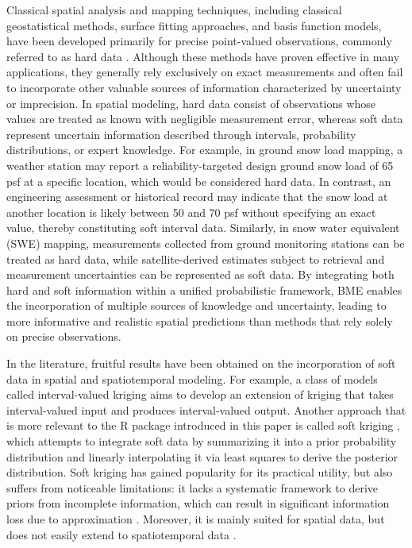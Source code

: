 Classical spatial analysis and mapping techniques, including classical geostatistical methods, surface fitting approaches, and basis function models, have been developed primarily for precise point-valued observations, commonly referred to as hard data \citep{jain1989fundamentals, journel1989fundamentals}. Although these methods have proven effective in many applications, they generally rely exclusively on exact measurements and often fail to incorporate other valuable sources of information characterized by uncertainty or imprecision. In spatial modeling, hard data consist of observations whose values are treated as known with negligible measurement error, whereas soft data represent uncertain information described through intervals, probability distributions, or expert knowledge. For example, in ground snow load mapping, a weather station may report a reliability-targeted design ground snow load of 65 psf at a specific location, which would be considered hard data. In contrast, an engineering assessment or historical record may indicate that the snow load at another location is likely between 50 and 70 psf without specifying an exact value, thereby constituting soft interval data. Similarly, in snow water equivalent (SWE) mapping, measurements collected from ground monitoring stations can be treated as hard data, while satellite-derived estimates subject to retrieval and measurement uncertainties can be represented as soft data. By integrating both hard and soft information within a unified probabilistic framework, BME enables the incorporation of multiple sources of knowledge and uncertainty, leading to more informative and realistic spatial predictions than methods that rely solely on precise observations.

In the literature, fruitful results have been obtained on the incorporation of soft data in spatial and spatiotemporal modeling. For example, a class of models called interval-valued kriging \citep{diamond88, bean22} aims to develop an extension of kriging that takes interval-valued input and produces interval-valued output. Another approach that is more relevant to the R package introduced in this paper is called soft kriging \citep{journel1986constrained}, which attempts to integrate soft data by summarizing it into a prior probability distribution and linearly interpolating it via least squares to derive the posterior distribution. Soft kriging has gained popularity for its practical utility, but also suffers from noticeable limitations: it lacks a systematic framework to derive priors from incomplete information, which can result in significant information loss due to approximation \citep{christakos1998bayesian, journel1986constrained}. Moreover, it is mainly suited for spatial data, but does not easily extend to spatiotemporal data \citep{dowd1991review}.

